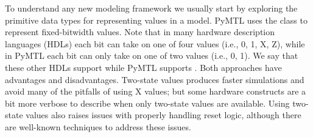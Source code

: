\documentclass{cbxdoc}
\begin{document}
To understand any new modeling framework we usually start by exploring
the primitive data types for representing values in a model. PyMTL uses
the  class to represent fixed-bitwidth values. Note that in
many hardware description languages (HDLs) each bit can take on one of
four values (i.e., 0, 1, X, Z), while in PyMTL each bit can only take on
one of two values (i.e., 0, 1). We say that these other HDLs support
 while PyMTL supports . Both
approaches have advantages and disadvantages. Two-state values produces
faster simulations and avoid many of the pitfalls of using X values; but
some hardware constructs are a bit more verbose to describe when only
two-state values are available. Using two-state values also raises issues
with properly handling reset logic, although there are well-known
techniques to address these issues.
\end{document}
